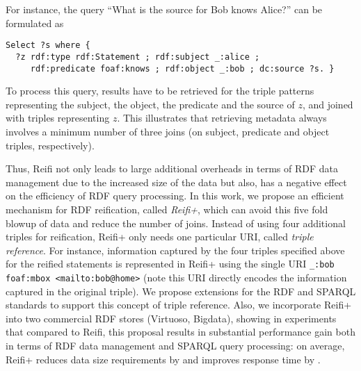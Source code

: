 \begin{example}
For instance, the query ``What is the source for Bob knows Alice?'' can be formulated as 

\begin{footnotesize}%
	\begin{verbatim}
Select ?s where {
  ?z rdf:type rdf:Statement ; rdf:subject _:alice ;
     rdf:predicate foaf:knows ; rdf:object _:bob ; dc:source ?s. }

\end{verbatim}%
\end{footnotesize}
To process this query, results have to be retrieved for the triple patterns representing the subject, the object, the predicate and the source of $z$, and joined with triples representing $z$. This illustrates that retrieving metadata always involves a minimum number of three joins (on subject, predicate and object triples, respectively). 
\end{example}

Thus, Reifi not only leads to large additional overheads in terms of RDF data management due to the increased size of the data but also, has a negative effect on the efficiency of RDF query processing. In this work, we propose an efficient mechanism for RDF reification, called \emph{Reifi+}, which can avoid this five fold blowup of data and reduce the number of joins. Instead of using four additional triples for reification, Reifi+ only needs one particular URI, called \emph{triple reference}. For instance, information captured by the four triples specified above for the reified statements is represented in Reifi+ using the single URI \verb+_:bob foaf:mbox <mailto:bob@home>+ (note this URI directly encodes the information captured in the original triple). We propose extensions for the RDF and SPARQL standards to support this concept of triple reference. Also, we incorporate Reifi+ into two commercial RDF stores (Virtuoso, Bigdata), showing in experiments that compared to Reifi, this proposal results in substantial performance gain both in terms of RDF data management and SPARQL query processing: on average, Reifi+ reduces data size requirements by  and improves response time by .

%

